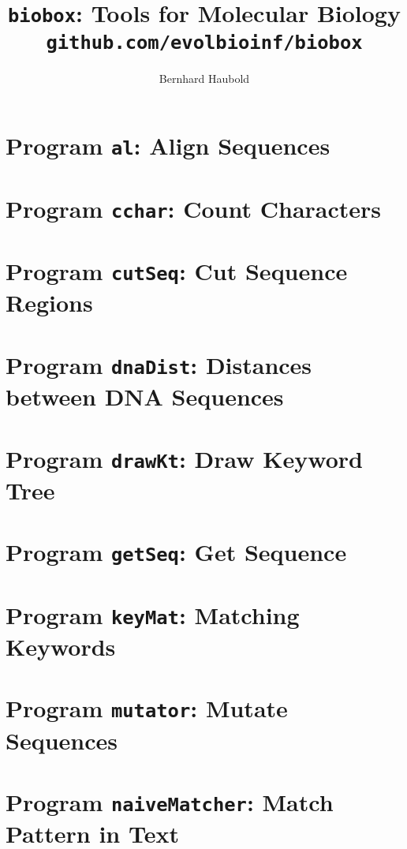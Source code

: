 \documentclass[a4paper]{report}
\begin{document}
\pagestyle{noweb}

\title{\texttt{biobox}: Tools for Molecular Biology\\
\small\texttt{github.com/evolbioinf/biobox}}
\author{Bernhard Haubold}
\maketitle
\tableofcontents

\chapter{Program \texttt{al}: Align Sequences}\label{ch:al}

\chapter{Program \texttt{cchar}: Count Characters}\label{ch:cch}

\chapter{Program \texttt{cutSeq}: Cut Sequence Regions}\label{ch:cut}

\chapter{Program \texttt{dnaDist}: Distances between DNA Sequences}\label{ch:dna}

\chapter{Program \texttt{drawKt}: Draw Keyword Tree}\label{ch:dkt}

\chapter{Program \texttt{getSeq}: Get Sequence}\label{ch:get}

\chapter{Program \texttt{keyMat}: Matching Keywords}\label{ch:km}

\chapter{Program \texttt{mutator}: Mutate Sequences}\label{ch:mut}

\chapter{Program \texttt{naiveMatcher}: Match Pattern in
  Text}\label{ch:nm}

\end{document}
